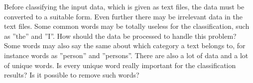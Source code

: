 Before classifying the input data, which is given as text files, the data must be
converted to a suitable form. Even further there may be irrelevant data
in the text files. Some common words may be totally useless for the classification,
such as ''the'' and ''I''. How should the data be processed to handle this
problem? Some words may also say the same about which category a text belongs to, for instance
words as ''person'' and ''persons''. There are also a lot of data and  a lot of
unique words. Is every unique word really important for the classification
results? Is it possible to remove such words?



